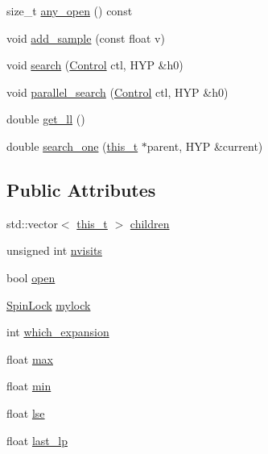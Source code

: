 \begin{DoxyCompactItemize}
\item 
size\+\_\+t \hyperlink{class_full_m_c_t_s_node_a40737e596a316340132778af3b71cf0a}{any\+\_\+open} () const
\item 
void \hyperlink{class_full_m_c_t_s_node_a6c2d1085f97b412e6597286c40a7aeea}{add\+\_\+sample} (const float v)
\item 
void \hyperlink{class_full_m_c_t_s_node_a99fd09625120aa0761f113bd44e5afff}{search} (\hyperlink{struct_control}{Control} ctl, H\+YP \&h0)
\item 
void \hyperlink{class_full_m_c_t_s_node_a55ea8b152892f1da0c298e8af0df632f}{parallel\+\_\+search} (\hyperlink{struct_control}{Control} ctl, H\+YP \&h0)
\item 
double \hyperlink{class_full_m_c_t_s_node_ab665859a9cdde4017dda841006a26dc2}{get\+\_\+ll} ()
\item 
double \hyperlink{class_full_m_c_t_s_node_a822ebc234b6c508c7c4cc255f205f8f9}{search\+\_\+one} (\hyperlink{class_full_m_c_t_s_node_afcc6a60f2d45fd1d6c4bd5f4998b147d}{this\+\_\+t} $\ast$parent, H\+YP \&current)
\end{DoxyCompactItemize}
\subsection*{Public Attributes}
\begin{DoxyCompactItemize}
\item 
std\+::vector$<$ \hyperlink{class_full_m_c_t_s_node_afcc6a60f2d45fd1d6c4bd5f4998b147d}{this\+\_\+t} $>$ \hyperlink{class_full_m_c_t_s_node_ac9bdca86a2e0f0030952e00f5ba0b1b2}{children}
\item 
unsigned int \hyperlink{class_full_m_c_t_s_node_a147985f7b1fdf0b3340d95192ff3cc57}{nvisits}
\item 
bool \hyperlink{class_full_m_c_t_s_node_ad2d8207e6e8b21d8bff3544ac1299764}{open}
\item 
\hyperlink{class_spin_lock}{Spin\+Lock} \hyperlink{class_full_m_c_t_s_node_a01c6d7375326e6e6f51cd1a8173d52d2}{mylock}
\item 
int \hyperlink{class_full_m_c_t_s_node_acc931c9ebb39cd57d2dd0a87d125b20c}{which\+\_\+expansion}
\item 
float \hyperlink{class_full_m_c_t_s_node_a0c548b2348ccdc653b000bca71bac432}{max}
\item 
float \hyperlink{class_full_m_c_t_s_node_a5d5e323a0ece2d29eff487b2d60a7e3f}{min}
\item 
float \hyperlink{class_full_m_c_t_s_node_a3b1ed2832765499980b827263d39cf79}{lse}
\item 
float \hyperlink{class_full_m_c_t_s_node_afe3db87ad724df0a91564d9f9bb757cd}{last\+\_\+lp}
\end{DoxyCompactItemize}
